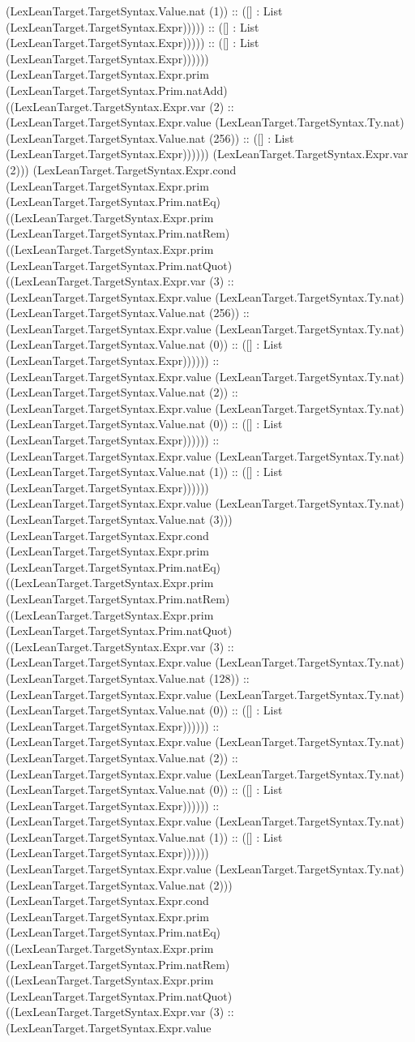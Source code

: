 \documentclass[11pt]{article}
\begin{document}
(LexLeanTarget.TargetSyntax.Value.nat (1)) :: ([] : List (LexLeanTarget.TargetSyntax.Expr))))) :: ([] : List (LexLeanTarget.TargetSyntax.Expr))))) :: ([] : List (LexLeanTarget.TargetSyntax.Expr)))))) (LexLeanTarget.TargetSyntax.Expr.prim (LexLeanTarget.TargetSyntax.Prim.natAdd) ((LexLeanTarget.TargetSyntax.Expr.var (2) :: (LexLeanTarget.TargetSyntax.Expr.value (LexLeanTarget.TargetSyntax.Ty.nat) (LexLeanTarget.TargetSyntax.Value.nat (256)) :: ([] : List (LexLeanTarget.TargetSyntax.Expr)))))) (LexLeanTarget.TargetSyntax.Expr.var (2))) (LexLeanTarget.TargetSyntax.Expr.cond (LexLeanTarget.TargetSyntax.Expr.prim (LexLeanTarget.TargetSyntax.Prim.natEq) ((LexLeanTarget.TargetSyntax.Expr.prim (LexLeanTarget.TargetSyntax.Prim.natRem) ((LexLeanTarget.TargetSyntax.Expr.prim (LexLeanTarget.TargetSyntax.Prim.natQuot) ((LexLeanTarget.TargetSyntax.Expr.var (3) :: (LexLeanTarget.TargetSyntax.Expr.value (LexLeanTarget.TargetSyntax.Ty.nat) (LexLeanTarget.TargetSyntax.Value.nat (256)) :: (LexLeanTarget.TargetSyntax.Expr.value (LexLeanTarget.TargetSyntax.Ty.nat) (LexLeanTarget.TargetSyntax.Value.nat (0)) :: ([] : List (LexLeanTarget.TargetSyntax.Expr)))))) :: (LexLeanTarget.TargetSyntax.Expr.value (LexLeanTarget.TargetSyntax.Ty.nat) (LexLeanTarget.TargetSyntax.Value.nat (2)) :: (LexLeanTarget.TargetSyntax.Expr.value (LexLeanTarget.TargetSyntax.Ty.nat) (LexLeanTarget.TargetSyntax.Value.nat (0)) :: ([] : List (LexLeanTarget.TargetSyntax.Expr)))))) :: (LexLeanTarget.TargetSyntax.Expr.value (LexLeanTarget.TargetSyntax.Ty.nat) (LexLeanTarget.TargetSyntax.Value.nat (1)) :: ([] : List (LexLeanTarget.TargetSyntax.Expr)))))) (LexLeanTarget.TargetSyntax.Expr.value (LexLeanTarget.TargetSyntax.Ty.nat) (LexLeanTarget.TargetSyntax.Value.nat (3))) (LexLeanTarget.TargetSyntax.Expr.cond (LexLeanTarget.TargetSyntax.Expr.prim (LexLeanTarget.TargetSyntax.Prim.natEq) ((LexLeanTarget.TargetSyntax.Expr.prim (LexLeanTarget.TargetSyntax.Prim.natRem) ((LexLeanTarget.TargetSyntax.Expr.prim (LexLeanTarget.TargetSyntax.Prim.natQuot) ((LexLeanTarget.TargetSyntax.Expr.var (3) :: (LexLeanTarget.TargetSyntax.Expr.value (LexLeanTarget.TargetSyntax.Ty.nat) (LexLeanTarget.TargetSyntax.Value.nat (128)) :: (LexLeanTarget.TargetSyntax.Expr.value (LexLeanTarget.TargetSyntax.Ty.nat) (LexLeanTarget.TargetSyntax.Value.nat (0)) :: ([] : List (LexLeanTarget.TargetSyntax.Expr)))))) :: (LexLeanTarget.TargetSyntax.Expr.value (LexLeanTarget.TargetSyntax.Ty.nat) (LexLeanTarget.TargetSyntax.Value.nat (2)) :: (LexLeanTarget.TargetSyntax.Expr.value (LexLeanTarget.TargetSyntax.Ty.nat) (LexLeanTarget.TargetSyntax.Value.nat (0)) :: ([] : List (LexLeanTarget.TargetSyntax.Expr)))))) :: (LexLeanTarget.TargetSyntax.Expr.value (LexLeanTarget.TargetSyntax.Ty.nat) (LexLeanTarget.TargetSyntax.Value.nat (1)) :: ([] : List (LexLeanTarget.TargetSyntax.Expr)))))) (LexLeanTarget.TargetSyntax.Expr.value (LexLeanTarget.TargetSyntax.Ty.nat) (LexLeanTarget.TargetSyntax.Value.nat (2))) (LexLeanTarget.TargetSyntax.Expr.cond (LexLeanTarget.TargetSyntax.Expr.prim (LexLeanTarget.TargetSyntax.Prim.natEq) ((LexLeanTarget.TargetSyntax.Expr.prim (LexLeanTarget.TargetSyntax.Prim.natRem) ((LexLeanTarget.TargetSyntax.Expr.prim (LexLeanTarget.TargetSyntax.Prim.natQuot) ((LexLeanTarget.TargetSyntax.Expr.var (3) :: (LexLeanTarget.TargetSyntax.Expr.value 
\end{document}
